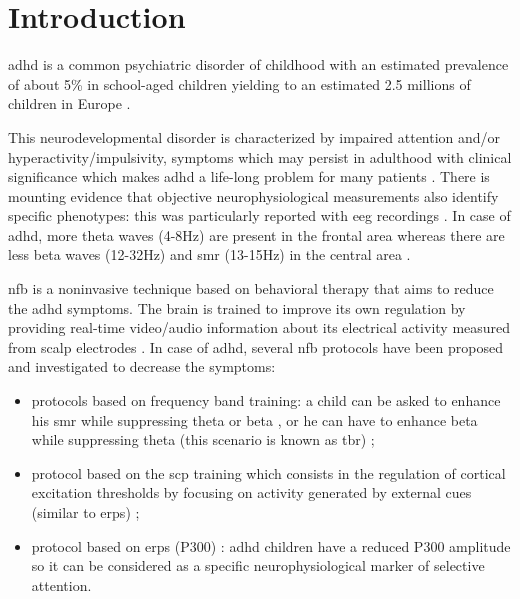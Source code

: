 

\section{Introduction} 

\gls{adhd} is a common psychiatric disorder of childhood with an estimated prevalence of about 5\% in school-aged children yielding to an 
estimated 2.5 millions of children in Europe \citep{DSM-5}.

This neurodevelopmental disorder is characterized by impaired attention and/or hyperactivity/impulsivity, symptoms which may persist 
in adulthood with clinical significance which makes \gls{adhd} a life-long problem for many patients \citep{Faraone2006}. There is mounting evidence 
that objective neurophysiological  measurements also identify specific phenotypes: this was particularly reported with \gls{eeg} 
recordings \citep{loo2017}. In case of \gls{adhd}, more theta waves (4-8Hz) are present in the frontal area
 whereas there are less beta waves (12-32Hz) and \gls{smr} (13-15Hz) in the central area \citep{Monastra2005, Matouvsek1984,
 Janzen1995}. 

\gls{nfb} is a noninvasive technique based on behavioral therapy that aims to reduce the \gls{adhd} symptoms.
 The brain is trained to improve its own regulation by providing real-time video/audio information 
about its electrical activity measured from scalp electrodes \citep{Arns2015, Steffert2010}. In case of \gls{adhd}, several
 \gls{nfb} protocols have been proposed and investigated to decrease the symptoms: 
\begin{itemize}
	\item protocols based on frequency band training: a child can be asked to enhance his \gls{smr} 
	while suppressing theta or beta \citep{Lubar1976}, or he can have to enhance beta
	while suppressing theta (this scenario is known as \gls{tbr}) \citep{Arns2013};
	\item protocol based on the \gls{scp} training which consists in the regulation of cortical excitation 
	thresholds by focusing on activity generated by external cues 
	(similar to \gls{erps}) \citep{Heinrich2004, Banaschewski2007}; 
	\item protocol based on \gls{erps} (P300) \citep{Fouillen2017}: \gls{adhd} children have a reduced P300 
	amplitude so it can be considered as a specific neurophysiological marker 
	of selective attention. 
\end{itemize} 

